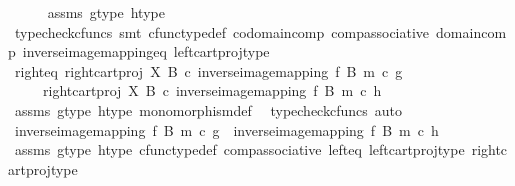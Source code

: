 \begin{isabellebody}
\ \ \ \ \isamarkupfalse%
\ assms\ g{\isacharunderscore}{\kern0pt}type\ h{\isacharunderscore}{\kern0pt}type\isanewline
\ \ \ \ \isamarkupfalse%
\ {\isacharparenleft}{\kern0pt}typecheck{\isacharunderscore}{\kern0pt}cfuncs{\isacharcomma}{\kern0pt}\ smt\ cfunc{\isacharunderscore}{\kern0pt}type{\isacharunderscore}{\kern0pt}def\ codomain{\isacharunderscore}{\kern0pt}comp\ comp{\isacharunderscore}{\kern0pt}associative\ domain{\isacharunderscore}{\kern0pt}comp\ inverse{\isacharunderscore}{\kern0pt}image{\isacharunderscore}{\kern0pt}mapping{\isacharunderscore}{\kern0pt}eq\ left{\isacharunderscore}{\kern0pt}cart{\isacharunderscore}{\kern0pt}proj{\isacharunderscore}{\kern0pt}type{\isacharparenright}{\kern0pt}\ \isanewline
\ \ \isamarkupfalse%
\ \isamarkupfalse%
\ right{\isacharunderscore}{\kern0pt}eq{\isacharcolon}{\kern0pt}\ {\isachardoublequoteopen}{\isacharparenleft}{\kern0pt}right{\isacharunderscore}{\kern0pt}cart{\isacharunderscore}{\kern0pt}proj\ X\ B\ {\isasymcirc}\isactrlsub c\ inverse{\isacharunderscore}{\kern0pt}image{\isacharunderscore}{\kern0pt}mapping\ f\ B\ m{\isacharparenright}{\kern0pt}\ {\isasymcirc}\isactrlsub c\ g\isanewline
\ \ \ \ {\isacharequal}{\kern0pt}\ {\isacharparenleft}{\kern0pt}right{\isacharunderscore}{\kern0pt}cart{\isacharunderscore}{\kern0pt}proj\ X\ B\ {\isasymcirc}\isactrlsub c\ inverse{\isacharunderscore}{\kern0pt}image{\isacharunderscore}{\kern0pt}mapping\ f\ B\ m{\isacharparenright}{\kern0pt}\ {\isasymcirc}\isactrlsub c\ h{\isachardoublequoteclose}\isanewline
\ \ \ \ \isamarkupfalse%
\ assms\ g{\isacharunderscore}{\kern0pt}type\ h{\isacharunderscore}{\kern0pt}type\ monomorphism{\isacharunderscore}{\kern0pt}def{}\ \isamarkupfalse%
\ {\isacharparenleft}{\kern0pt}typecheck{\isacharunderscore}{\kern0pt}cfuncs{\isacharcomma}{\kern0pt}\ auto{\isacharparenright}{\kern0pt}\isanewline
\ \ \isamarkupfalse%
\ \isamarkupfalse%
\ {\isachardoublequoteopen}inverse{\isacharunderscore}{\kern0pt}image{\isacharunderscore}{\kern0pt}mapping\ f\ B\ m\ {\isasymcirc}\isactrlsub c\ g\ {\isacharequal}{\kern0pt}\ inverse{\isacharunderscore}{\kern0pt}image{\isacharunderscore}{\kern0pt}mapping\ f\ B\ m\ {\isasymcirc}\isactrlsub c\ h{\isachardoublequoteclose}\isanewline
\ \ \ \ \isamarkupfalse%
\ assms\ g{\isacharunderscore}{\kern0pt}type\ h{\isacharunderscore}{\kern0pt}type\ cfunc{\isacharunderscore}{\kern0pt}type{\isacharunderscore}{\kern0pt}def\ comp{\isacharunderscore}{\kern0pt}associative\ left{\isacharunderscore}{\kern0pt}eq\ left{\isacharunderscore}{\kern0pt}cart{\isacharunderscore}{\kern0pt}proj{\isacharunderscore}{\kern0pt}type\ right{\isacharunderscore}{\kern0pt}cart{\isacharunderscore}{\kern0pt}proj{\isacharunderscore}{\kern0pt}type\isanewline

\end{isabellebody}
